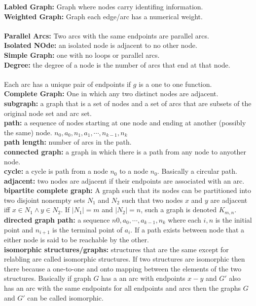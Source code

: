 \documentclass[14pt]{extreport}
\begin{document}
\textbf{Labled Graph:} Graph where nodes carry identifing information.\\
\textbf{Weighted Graph:} Graph each edge/arc has a numerical weight.\\
\\
\textbf{Parallel Arcs:} Two arcs with the same endpoints are parallel arcs. \\
\textbf{Isolated NOde:} an isolated node is adjacent to no other node.\\
\textbf{Simple Graph:} one with no loops or parallel arcs.\\
\textbf{Degree:} the degree of a node is the number of arcs that end at that node.\\
\\
Each arc has a unique pair of endpoints if $g$ is a one to one function.\\
\textbf{Complete Graph:} One in which any two distinct nodes are adjacent.\\
\textbf{subgraph:} a graph that is a set of nodes and a set of arcs that are subsets of the original node set and arc set.\\
\textbf{path:} a sequence of nodes starting at one node and ending at another (possibly the same) node. $n_0,a_0,n_1,a_1, \cdots, n_{k-1},n_k$\\
\textbf{path length:} number of arcs in the path.\\
\textbf{connected graph:} a graph in which there is a path from any node to anyother node.\\
\textbf{cycle:} a cycle is path from a node $n_0$ to a node $n_0$. Basically a circular path.\\
\textbf{adjacent:} two nodes are adjacent if their endpoints are associated with an arc.\\
\textbf{bipartite complete graph:} A graph such that its nodes can be partitioned into two disjoint nonempty sets $N_1$ and $N_2$ such that two nodes $x$ and $y$
are adjacent iff $x \in N_1 \land y \in N_2$. If $|N_1| = m$ and $|N_2| = n$, such a graph is denoted $K_{m,n}$.\\
\textbf{directed graph path:} a sequence $n0,a_0, \cdots, a_{k-1},n_k$ where each $i,n$ is the initial point and $n_{i+1}$ is the terminal point of $a_i$. If a path
exists between node that a either node is said to be reachable by the other.\\
\textbf{isomorphic structures/graphs:} structures that are the same except for relabling are called isomorphic structures. If two structures are isomorphic then there because
a one-to-one and onto mapping between the elements of the two structures. Basically if graph $G$ has a an arc with endpoints $x-y$ and $G'$ also has an arc with the same endpoints
for all endpoints and arcs then the graphs $G$ and $G'$ can be called isomorphic.\\
\end{document}

